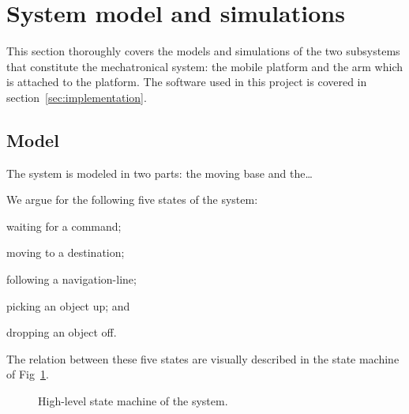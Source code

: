 \section{System model and simulations}
This section thoroughly covers the models and simulations of the two subsystems that constitute the mechatronical system:
the mobile platform and the arm which is attached to the platform.
The software used in this project is covered in section~\ref{sec:implementation}.

\subsection{Model}

The system is modeled in two parts: the moving base and the\ldots


We argue for the following five states of the system:
\begin{inline-enum}
\item waiting for a command;
\item moving to a destination;
\item following a navigation-line;
\item picking an object up; and
\item dropping an object off.
\end{inline-enum}
The relation between these five states are visually described in the state machine of Fig~\ref{fig:state_machine}.
\begin{figure}[ht]
  \centering
  \caption{High-level state machine of the system.}
  \label{fig:state_machine}
\end{figure}

